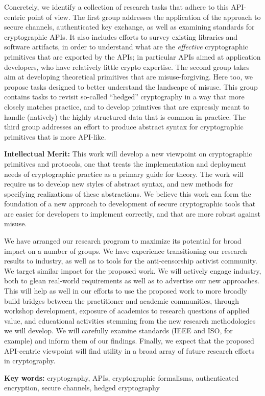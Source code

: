 \documentclass[10pt]{article}
\begin{document}
Concretely, we identify a collection of research tasks that adhere to
this API-centric point of view.  The first group addresses the
application of the approach to secure channels, authenticated key
exchange, as well as examining standards for cryptographic APIs.  It
also includes efforts to survey existing libraries and software
artifacts, in order to understand what are the \emph{effective}
cryptographic primitives that are exported by the APIs; in particular
APIs aimed at application developers, who have relatively little
crypto expertise.  
%
The second group takes aim at developing
theoretical primitives that are misuse-forgiving.  Here too, we
propose tasks designed to better understand the landscape of misuse.
This group contains tasks to revisit so-called ``hedged'' cryptography
in a way that more closely matches practice, and to develop primtives
that are expressly meant to handle (natively) the highly structured
data that is common in practice.
%
The third group addresses an effort to produce abstract syntax for
cryptographic primitives that is more API-like.
  

\smallskip
\noindent \textbf{Intellectual Merit:} This work will develop a new
viewpoint on cryptographic primitives and protocols, one that treats the
implementation and deployment needs of cryptographic practice as a
primary guide for theory.  The work will require us to develop new styles of
abstract syntax, and new methods for specifying realizations of these
abstractions.  
We believe this work can form the foundation of a new approach to
development of secure cryptographic tools that are easier for
developers to implement correctly, and that are more robust against
misuse.  

\smallskip

  We have arranged our research program to
maximize its potential for broad impact on a number of groups. We have
experience transitioning our research results to industry, as well as to tools for the anti-censorship
activist community. We target similar impact for the proposed
work. We will actively engage industry, both to glean real-world requirements
as well as to advertise our new approaches.  This will help as well in our efforts
to use the proposed work to more broadly build bridges between the practitioner
and academic communities, through workshop development, exposure of academics to 
research questions of applied value, and educational activities stemming from
the new research methodologies we will develop. We will carefully examine
standards (IEEE and ISO, for example) and inform them of our
findings. Finally, we expect that the proposed API-centric viewpoint will find utility in a broad array
of future research efforts in cryptography.

\vspace{1ex}
\noindent 
{\bf Key words:} cryptography, APIs, cryptographic formalisms,
authenticated encryption, secure channels, hedged cryptography
\end{document}
